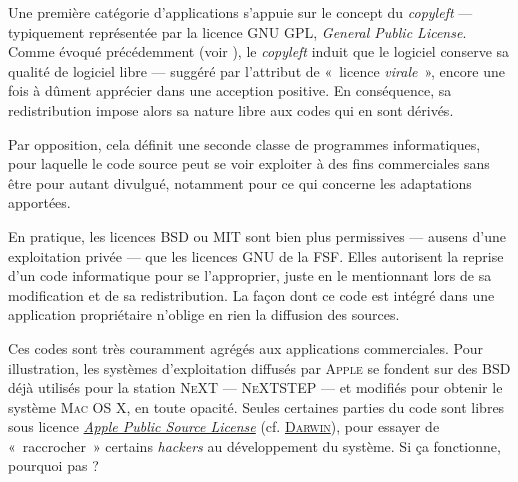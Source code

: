 Une première catégorie d'applications s'appuie sur le concept du \textit{copyleft} --- typiquement représentée par la licence GNU GPL, \textit{General Public License}. Comme évoqué précédemment (voir ), le \textit{copyleft} induit que le logiciel conserve sa qualité de logiciel libre --- suggéré par l'attribut de «~licence \emph{virale}~», encore une fois à dûment apprécier dans une acception positive. En conséquence, sa redistribution impose alors sa nature libre aux codes qui en sont dérivés. 

Par opposition, cela définit une seconde classe de programmes informatiques, pour laquelle le code source peut se voir exploiter à des fins commerciales sans être pour autant divulgué, notamment pour ce qui concerne les adaptations apportées.

En pratique, les licences BSD ou MIT sont bien plus permissives --- au\linebreak sens d'une exploitation privée --- que les licences GNU de la FSF. Elles autorisent la reprise d'un code informatique pour se l'approprier, juste en le mentionnant lors de sa modification et de sa redistribution. La fa\-çon dont ce code est intégré dans une application propriétaire n'oblige en rien la diffusion des sources.

Ces codes sont très couramment agrégés aux applications commerciales. Pour illustration, les systèmes d'exploitation diffusés par \textsc{Apple} se fondent sur des BSD déjà utilisés pour la station \textsc{NeXT} --- \textsc{NeXTSTEP} --- et modifiés pour obtenir le système \textsc{Mac OS X}, en toute opacité. Seules certaines parties du code sont libres sous licence \href{https://opensource.apple.com/apsl/}{\textit{Apple Public Source License}} (cf. \href{https://fr.wikipedia.org/wiki/Darwin_(informatique)}{\textsc{Darwin}}), pour essayer de «~raccrocher~» certains \textit{hackers} au développement du système. Si ça fonctionne, pourquoi
 pas ?

